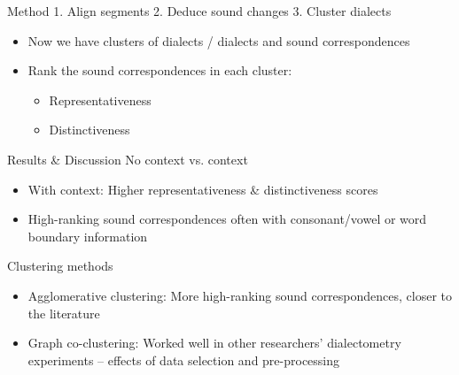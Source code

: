 \documentclass[xcolor={dvipsnames}]{beamer}
\begin{document}
\begin{frame}[t]{Method}{}
{ { 1.} Align segments \hspace{0.5em} { 2.} Deduce sound changes} \hspace{0.5em} { 3.} Cluster dialects

\vspace{4em}
\begin{itemize}
    \item  Now we have clusters of dialects / dialects and sound correspondences
    \item Rank the sound correspondences in each cluster: 
        \begin{itemize}
        \item Representativeness
        \item Distinctiveness
        \end{itemize}
\end{itemize}
\end{frame}

\begin{frame}{Results \& Discussion}
No context vs. context
\begin{itemize}
    \item With context: Higher representativeness \& distinctiveness scores
    \item High-ranking sound correspondences often with consonant/vowel or word boundary information
\end{itemize}

\pause
Clustering methods
\begin{itemize}
    \item Agglomerative clustering: More high-ranking sound correspondences, closer to the literature
    \item Graph co-clustering: Worked well in other researchers' dialectometry experiments -- effects of data selection and pre-processing
\end{itemize}
\end{frame}
\end{document}
